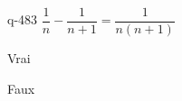 \begin{truefalse}{q-483}
$\dfrac{1}{n}- \dfrac{1}{n+1} =\dfrac{1}{n(n+1)}$
\item* Vrai
\item Faux
\end{truefalse}

